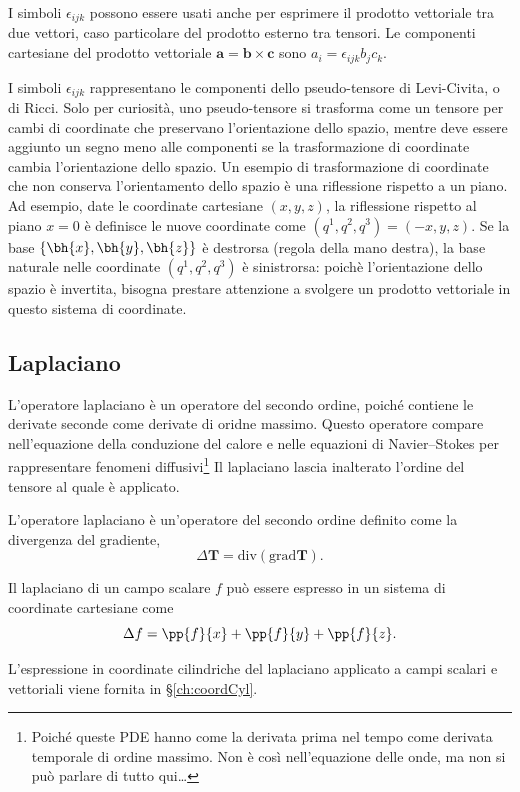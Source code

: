   \begin{remark}
   I simboli $\epsilon_{ijk}$ possono essere usati anche per esprimere il prodotto vettoriale tra due vettori, caso particolare del prodotto esterno tra tensori. Le componenti cartesiane del prodotto vettoriale $\bm{a} = \bm{b} \times \bm{c}$ sono $a_i = \epsilon_{ijk} b_j c_k$.
  \end{remark}
  \begin{remark}
   I simboli $\epsilon_{ijk}$ rappresentano le componenti dello pseudo-tensore di Levi-Civita, o di Ricci. Solo per curiosità, uno pseudo-tensore si trasforma come un tensore per cambi di coordinate che preservano l'orientazione dello spazio, mentre deve essere aggiunto un segno meno alle componenti se la trasformazione di coordinate cambia l'orientazione dello spazio. Un esempio di trasformazione di coordinate che non conserva l'orientamento dello spazio è una riflessione rispetto a un piano. Ad esempio, date le coordinate cartesiane $(x,y,z)$, la riflessione rispetto al piano $x=0$ è definisce le nuove coordinate come $(q^1,q^2,q^3) = (-x,y,z)$. Se la base $\{\bh{x},\bh{y},\bh{z}\}$ è destrorsa (regola della mano destra), la base naturale nelle coordinate $(q^1,q^2,q^3)$ è sinistrorsa: poichè l'orientazione dello spazio è invertita, bisogna prestare attenzione a svolgere un prodotto vettoriale in questo sistema di coordinate.
  \end{remark}
 
\subsection{Laplaciano}
L'operatore laplaciano è un operatore del secondo ordine, poiché contiene le derivate seconde come derivate di oridne massimo. Questo operatore compare nell'equazione della conduzione del calore e nelle equazioni di Navier--Stokes per rappresentare fenomeni diffusivi\footnote{Poiché queste PDE hanno come la derivata prima nel tempo come derivata temporale di ordine massimo. Non è così nell'equazione delle onde, ma non si può parlare di tutto qui\dots}
 Il laplaciano lascia inalterato l'ordine del tensore al quale è applicato. 
 \begin{operator}[Laplaciano] L'operatore laplaciano è un'operatore del secondo ordine definito come la divergenza del gradiente,
 \begin{equation}
  \Delta \bm{T} = \text{div} (\text{grad} \bm{T}).
 \end{equation}
 \end{operator}
 \begin{example}
  Il laplaciano di un campo scalare $f$ può essere espresso in un sistema di coordinate cartesiane come
  \begin{equation}
   \Delta f = \pp{f}{x} + \pp{f}{y} + \pp{f}{z}.
  \end{equation}
 \end{example}
 \begin{example}
  L'espressione in coordinate cilindriche del laplaciano applicato a campi scalari e vettoriali viene fornita in \S\ref{ch:coordCyl}.
 \end{example} 
 

